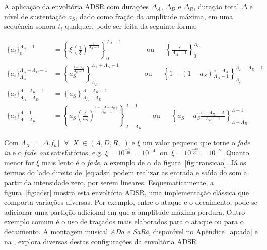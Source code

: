 A aplicação da envoltória ADSR com durações $\Delta_A$, $\Delta_D$ e $\Delta_R$, duração total $\Delta$ e nível de sustentação $a_S$, dado
como fração da amplitude máxima, em uma sequência sonora $t_i$ qualquer, pode ser feita da seguinte forma:

\begin{equation}\label{eq:adsr}
\begin{split}
\{a_i\}_0^{\Lambda_A-1} & = \left\{\xi\left(\frac{1}{\xi}\right)^{\frac{i}{\Lambda_A-1}}\right\}_0^{\Lambda_A-1} \;\;\quad\quad\quad \text{ou} \;\;\quad \left\{\frac{i}{\Lambda_A-1}\right\}_0^{\Lambda_A}\\
\{a_i\}_{\Lambda_A}^{\Lambda_A+\Lambda_D-1} & =\left\{a_S^{\frac{i-\Lambda_A}{\Lambda_D-1}}  \right\}_{\Lambda_A}^{\Lambda_A+\Lambda_D-1} \;\;\quad \quad\quad \text{ou} \quad\;\; \left\{1-(1-a_S)\frac{i-\Lambda_A}{\Lambda_D-1}\right\}_{\Lambda_A}^{\Lambda_A+\Lambda_D-1}\\
\{ a_i \}_{\Lambda_A+\Lambda_D}^{\Lambda-\Lambda_R-1} & =\left\{ a_S \right\}_{\Lambda_A+\Lambda_D}^{\Lambda-\Lambda_R-1} \\
\{ a_i \}_{\Lambda-\Lambda_R}^{\Lambda-1} & =\left\{ a_S\left(\frac{\xi}{a_S} \right)^{\frac{i-(\Lambda-\Lambda_R)}{\Lambda_R-1}} \right\}_{\Lambda-\Lambda_R}^{\Lambda-1} \quad\;\; \text{ou} \quad\;\; \left\{ a_S - a_S\frac{i+\Lambda_R-\Lambda}{\Lambda_R-1}\right\}_{\Lambda-\Lambda_R}^{\Lambda-1} 
\end{split}
\end{equation}

Com $\Lambda_X=\lfloor \Delta . f_a \rfloor\;\;\forall\;\; X \; \in (A,D,R,\;)$ e $\xi$ um valor pequeno que torne o \emph{fade in} e o \emph{fade out} satisfatórios, e.g. $\xi=10^{\frac{-80}{20}}=10^{-4}\;$ ou $\;\xi=10^{\frac{-40}{20}}=10^{-2}$. Quanto menor for $\xi$ mais lento é o \emph{fade}, a exemplo de $\alpha$ da figura~\ref{fig:transicao}. Já os termos do lado direito de~\ref{eq:adsr} podem realizar as entrada e saída do som a partir da intensidade zero, por serem lineares. 
Esquematicamente, a figura~\ref{fig:adsr} mostra esta envoltória ADSR, 
uma implementação clássica que comporta variações diversas. Por exemplo,
entre o ataque e o decaimento, pode-se adicionar uma partição adicional em que a amplitude
máxima perdura. Outro exemplo comum é o uso de traçados mais elaborados para o
ataque ou para o decaimento. A montagem musical \emph{ADa e SaRa}, disponível no Apêndice~\ref{ap:ada}
e na \massa, explora diversas destas configurações da envoltória ADSR


